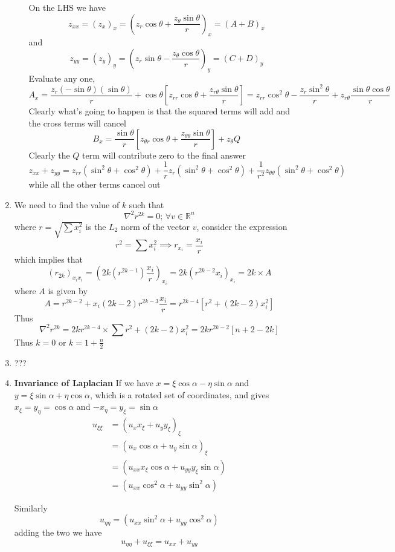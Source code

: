\documentclass[12pt]{article}
\begin{document}
\begin{enumerate}
\begin{enumerate}
On the LHS we have
$$
z_{xx} = (z_{x})_{x} = \left( z_{r}\cos \theta + \frac{z_{\theta}\sin \theta}{r} \right)_{x} = (A+B)_{x}
$$
and 
$$
z_{yy} = (z_{y})_{y} = \left( z_{r}\sin \theta - \frac{z_{\theta}\cos \theta}{r} \right)_{y} = (C+D)_{y}
$$
Evaluate any one, 
$$
A_{x} = \frac{z_{r}(-\sin \theta)(\sin \theta)}{r} + \cos \theta \left[ z_{rr}\cos \theta + \frac{z_{r\theta}\sin \theta}{r} \right] = z_{rr}\cos ^{2}\theta  -\frac{z_{r}\sin ^{2}\theta}{r} + z_{r \theta} \frac{\sin \theta \cos \theta}{r}
$$
Clearly what's going to happen is that the squared terms will add and the cross terms will cancel
$$
B_{x} = \frac{\sin \theta}{r}\left[ z_{\theta r}\cos \theta + \frac{z_{\theta \theta} \sin \theta}{r} \right] + z_{\theta }Q
$$
Clearly the $Q$ term will contribute zero to the final answer
$$
z_{xx} + z_{yy} = z_{rr}(\sin ^{2} \theta + \cos ^{2} \theta) + \frac{1}{r}z_{r}(\sin ^{2} \theta + \cos ^{2} \theta) + \frac{1}{r^{2}}z_{\theta \theta} (\sin ^{2} \theta + \cos ^{2} \theta)
$$
while all the other terms cancel out
\end{enumerate}
\item We need to find the value of $k$ such that
$$
\nabla^{2}r^{2k} = 0; \, \forall v \in \mathbb{R}^{n}
$$
where $r = \sqrt{ \sum x_{i}^{2} }$ is the $L_{2}$ norm of the vector $v$, consider the expression
$$
r^{2} = \sum x_{i}^{2} \implies r_{x_{i}} = \frac{x_{i}}{r}
$$
which implies that
$$
(r_{2k})_{x_{i}x_{i}} = \left( 2k(r^{2k-1})\frac{x_{i}}{r} \right)_{x_{i}} = 2k(r^{2k-2}x_{i})_{x_{i}} = 2k\times A
$$
where $A$ is given by
$$
A = r^{2k-2} + x_{i}(2k-2)r^{2k-3}\frac{x_{i}}{r} = r^{2k-4}[r^{2} + (2k-2)x_{i}^{2}]
$$
Thus 
$$
\nabla^{2} r^{2k} = 2kr^{2k-4} \times \sum r^{2} + (2k-2)x_{i}^{2} = 2kr^{2k-2}[n+2-2k]
$$
Thus $k = 0$ or $k = 1 + \frac{n}{2}$
\item ???
\item \textbf{Invariance of Laplacian}
If we have $x = \xi \cos \alpha - \eta \sin \alpha$ and $y = \xi \sin \alpha + \eta \cos \alpha$, which is a rotated set of coordinates, and gives $x_{\xi} = y_{\eta} = \cos \alpha$ and $-x_{\eta }= y_{\xi}=\sin \alpha$
$$
\begin{aligned}
u_{\xi \xi} &= (u_{x}x_{\xi} + u_{y}y_{\xi})_{\xi} \\& = (u_{x}\cos \alpha + u_{y}\sin \alpha) _{\xi} \\
&= (u_{xx}x_{\xi}\cos \alpha + u_{yy}y_{\xi}\sin \alpha) \\&= (u_{xx}\cos ^{2}\alpha + u_{yy}\sin ^{2} \alpha)
\end{aligned}
$$

Similarly 
$$
u_{\eta \eta} = (u_{xx}\sin ^{2}\alpha + u_{yy}\cos ^{2} \alpha) 
$$
adding the two we have
$$
u_{\eta \eta} + u_{\xi \xi} = u_{x x} + u_{y y}
$$

\end{enumerate}
\end{document}

